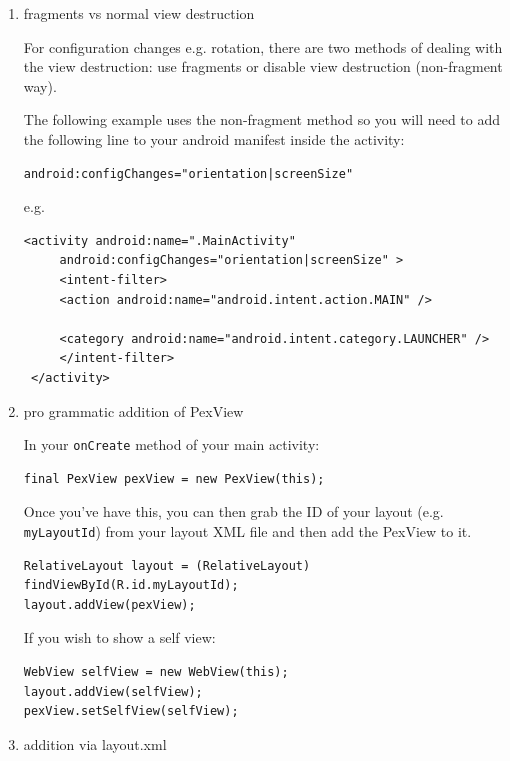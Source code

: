\documentclass[a4paper,11pt]{article}
\begin{document}
\begin{enumerate}
\item fragments vs normal view destruction
\label{sec:org4e0427c}

For configuration changes e.g. rotation, there are two methods of
dealing with the view destruction: use fragments or disable view
destruction (non-fragment way).

The following example uses the non-fragment method so you will need to
add the following line to your android manifest inside the activity:

\begin{verbatim}
android:configChanges="orientation|screenSize"
\end{verbatim}

e.g.

\begin{verbatim}
<activity android:name=".MainActivity"
     android:configChanges="orientation|screenSize" >
     <intent-filter>
     <action android:name="android.intent.action.MAIN" />

     <category android:name="android.intent.category.LAUNCHER" />
     </intent-filter>
 </activity>
\end{verbatim}

\item pro grammatic addition of PexView
\label{sec:orgcbbd3a9}

In your \texttt{onCreate} method of your main activity:

\begin{verbatim}
final PexView pexView = new PexView(this);
\end{verbatim}

Once you've have this, you can then grab the ID of your layout
(e.g. \texttt{myLayoutId}) from your layout XML file and then add the PexView
to it.

\begin{verbatim}
RelativeLayout layout = (RelativeLayout) findViewById(R.id.myLayoutId);
layout.addView(pexView);
\end{verbatim}

If you wish to show a self view:

\begin{verbatim}
WebView selfView = new WebView(this);
layout.addView(selfView);
pexView.setSelfView(selfView);
\end{verbatim}

\item addition via layout.xml
\label{sec:orgb2e9345}


\end{enumerate}
\end{document}
